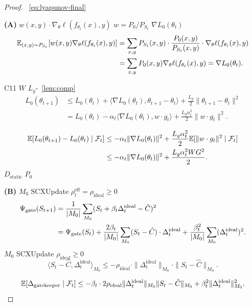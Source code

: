 \begin{proof}
~\eqref{eq:lyapunov-final} 

\textbf{(A) }  $w(x,y) \cdot \nabla_\theta \ell(f_{\theta_t}(x), y)$ $w = P_0/P_{S_t}$ $\nabla L_0(\theta_t)$ 
\begin{align}
    \mathbb{E}_{(x,y) \sim P_{S_t}}[w(x,y) \nabla_\theta \ell(f_{\theta_t}(x), y)]
    &= \sum_{x,y} P_{S_t}(x,y) \cdot \frac{P_0(x,y)}{P_{S_t}(x,y)} \cdot \nabla_\theta \ell(f_{\theta_t}(x), y) \notag\\
    &= \sum_{x,y} P_0(x,y) \nabla_\theta \ell(f_{\theta_t}(x), y) = \nabla L_0(\theta_t).
\end{align}

 C11  $W$ $L_g$-~\ref{lem:comp}
\begin{align}
    L_0(\theta_{t+1}) &\leq L_0(\theta_t) + \langle \nabla L_0(\theta_t), \theta_{t+1} - \theta_t \rangle + \frac{L_g}{2}\|\theta_{t+1} - \theta_t\|^2 \\
    &= L_0(\theta_t) - \alpha_t \langle \nabla L_0(\theta_t), w \cdot g_t \rangle + \frac{L_g \alpha_t^2}{2} \|w \cdot g_t\|^2.
\end{align}

\begin{align}
    \mathbb{E}[L_0(\theta_{t+1}) - L_0(\theta_t) \mid \mathcal{F}_t]
    &\leq -\alpha_t \|\nabla L_0(\theta_t)\|^2 + \frac{L_g \alpha_t^2}{2} \mathbb{E}[\|w \cdot g_t\|^2 \mid \mathcal{F}_t] \notag\\
    &\leq -\alpha_t \|\nabla L_0(\theta_t)\|^2 + \frac{L_g \alpha_t^2 W G^2}{2}.
\end{align}
 $D_{\text{static}}$ \textbf{} $P_0$

\textbf{(B) }  $M_0$  SCXUpdate $\rho_t^{\text{eff}} = \rho_{\text{ideal}} \geq 0$ 
\begin{align}
    \Psi_{\text{gate}}(S_{t+1}) &= \frac{1}{|M_0|} \sum_{M_0} (S_t + \beta_t \Delta_t^{\text{ideal}} - \hat{C})^2 \notag\\
    &= \Psi_{\text{gate}}(S_t) + \frac{2\beta_t}{|M_0|} \sum_{M_0} (S_t - \hat{C}) \cdot \Delta_t^{\text{ideal}} + \frac{\beta_t^2}{|M_0|} \sum_{M_0} (\Delta_t^{\text{ideal}})^2.
\end{align}
 $M_0$  SCXUpdate $\rho_{\text{ideal}} \geq 0$
\begin{equation}
    \langle S_t - \hat{C}, \Delta_t^{\text{ideal}} \rangle_{M_0} \leq -\rho_{\text{ideal}} \cdot \|\Delta_t^{\text{ideal}}\|_{M_0} \cdot \|S_t - \hat{C}\|_{M_0}.
\end{equation}

\begin{equation}
    \mathbb{E}[\Delta_{\text{gatekeeper}} \mid \mathcal{F}_t] \leq -\beta_t \cdot 2\rho_{\text{ideal}} \|\Delta_t^{\text{ideal}}\|_{M_0} \|S_t - \hat{C}\|_{M_0} + \beta_t^2 \|\Delta_t^{\text{ideal}}\|_{M_0}^2.
\end{equation}


\end{proof}
